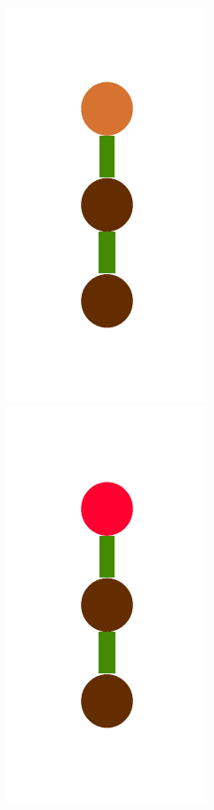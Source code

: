 \documentclass[a4paper,10pt]{article}
\begin{document}
\begin{figure}[t]
\includegraphics[scale=.26]{../figures/vector/4-2-4-constructor-induction-pre-6.pdf}
\includegraphics[scale=.26]{../figures/vector/4-2-4-constructor-induction-pre-7.pdf}

\end{figure}
\end{document}
